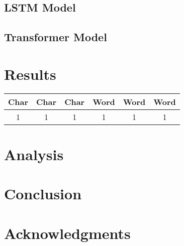 \documentclass[11pt,a4paper]{article}
\begin{document}
\subsection{LSTM Model}
\subsection{Transformer Model}

\section{Results}
\begin{center}
	\begin{tabular}{ c c c c c  c}
		Char & Char & Char & Word & Word & Word\\
		\hline
		1 & 1 & 1 & 1 & 1 & 1
	\end{tabular}
\end{center}

\section{Analysis}

\section{Conclusion}

\section*{Acknowledgments}



\end{document}
